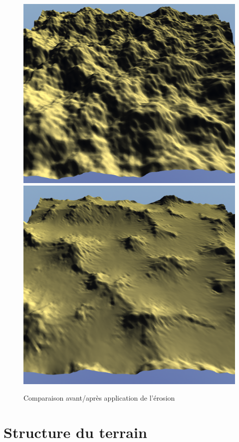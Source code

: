 \documentclass{EPUProjetDi}
\begin{document}
\begin{figure}[ht]
	\centering
	\includegraphics[scale=.4]{erosion_before}
	\includegraphics[scale=.4]{erosion_after}
	\caption{Comparaison avant/après application de l'érosion}
	\label{fig:erosion_comparison}
\end{figure}

\section{Structure du terrain}
\end{document}
